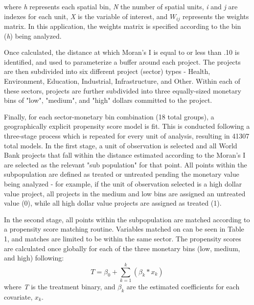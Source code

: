 \documentclass{article}\usepackage[]{graphicx}\usepackage[]{color}
\newenvironment{knitrout}{}{}  %
\begin{document}
\begin{knitrout}
where \textit{h} represents each spatial bin, \textit{N} the number of spatial units, \textit{i} and \textit{j} are indexes for each unit, \textit{X} is the variable of interest, and \begin{math}W_{ij}\end{math} represents the weights matrix.  
In this application, the weights matrix is specified according to the bin (\textit{h}) being analyzed.  
\par
Once calculated, the distance at which Moran's I is equal to or less than .10 is identified, and used to parameterize a buffer around each project.  
The projects are then subdivided into six different project (sector) types - Health, Environment, Education, Industrial, Infrastructure, and Other.  
Within each of these sectors, projects are further subdivided into three equally-sized monetary bins of "low", "medium", and "high" dollars committed to the project.
\par
Finally, for each sector-monetary bin combination (18 total groups), a geographically explicit propensity score model is fit.  
This is conducted following a three-stage process which is repeated for every unit of analysis, resulting in 41307 total models.
In the first stage, a unit of observation is selected and all World Bank projects that fall within the distance estimated according to the Moran's I are selected as the relevant "sub population" for that point.
All points within the subpopulation are defined as treated or untreated pending the monetary value being analyzed - for example, if the unit of observation selected is a high dollar value project, all projects in the medium and low bins are assigned an untreated value (0), while all high dollar value projects are assigned as treated (1).
\par
In the second stage, all points within the subpopulation are matched according to a propensity score matching routine.  
Variables matched on can be seen in Table 1, and matches are limited to be within the same sector. 
The propensity scores are calculated once globally for each of the three monetary bins (low, medium, and high) following:
\begin{equation}
T = \beta_{0} + \sum_{k=1}^{k}(\beta_{k}*x_{k})
\label{EQpropensity}
\end{equation}
where \textit{T} is the treatment binary, and \begin{math}\beta_{k}\end{math} are the estimated coefficients for each covariate, \begin{math}x_{k}\end{math}.  

\end{knitrout}
\end{document}
